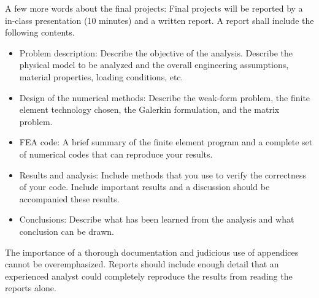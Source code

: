 \documentclass[12pt]{article}
\begin{document}
\begin{enumerate}
A few more words about the final projects: Final projects will be reported by a in-class presentation (10 minutes) and a written report. A report shall include the following contents.
\begin{itemize}
\item Problem description: Describe the objective of the analysis. Describe the physical model to be analyzed and the overall engineering assumptions, material properties, loading conditions, etc.
\item Design of the numerical methods: Describe the weak-form problem, the finite element technology chosen, the Galerkin formulation, and the matrix problem.
\item FEA code: A brief summary of the finite element program and a complete set of numerical codes that can reproduce your results.
\item Results and analysis: Include methods that you use to verify the correctness of your code. Include important results and a discussion should be accompanied these results.
\item Conclusions: Describe what has been learned from the analysis and what conclusion can be drawn.
\end{itemize}
The importance of a thorough documentation and judicious use of appendices cannot be overemphasized. Reports should include enough detail that an experienced analyst could completely reproduce the results from reading the reports alone.
\end{enumerate}
\end{document}
